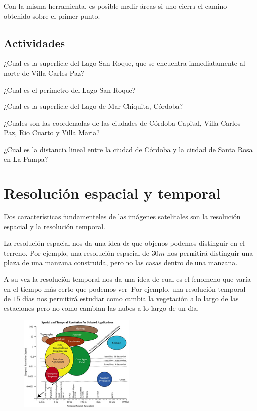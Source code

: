 \documentclass[a4paper,12pt]{book}
\begin{document}
Con la misma herramienta, es posible medir áreas si uno cierra el camino obtenido sobre el primer punto.

\section{Actividades}

\begin{que}
    ¿Cual es la superficie del Lago San Roque, que se encuentra inmediatamente al norte de Villa Carlos Paz?
\end{que}
\begin{que}
    ¿Cual es el perimetro del Lago San Roque?
\end{que}
\begin{que}
    ¿Cual es la superficie del Lago de Mar Chiquita, Córdoba?
\end{que}

\begin{que}
    ¿Cuales son las coordenadas de las ciudades de Córdoba Capital, Villa Carlos Paz, Rio Cuarto y Villa Maria?
\end{que}

\begin{que}
    ¿Cual es la distancia lineal entre la ciudad de Córdoba y la ciudad de Santa Rosa en La Pampa?
\end{que}

\chapter{Resolución espacial y temporal}
Dos características fundamenteles de las imágenes satelitales son la resolución espacial y la resolución temporal.

La resolución espacial nos da una idea de que objenos podemos distinguir en el terreno. Por ejemplo, una resolución espacial de $30m$ nos permitirá distinguir una plaza de una manzana construida, pero no las casas dentro de una manzana.

A su vez la resolución temporal nos da una idea de cual es el fenomeno que varía en el tiempo más corto que podemos ver. Por ejemplo, una resolución temporal de $15$ días nos permitirá estudiar como cambia la vegetación a lo largo de las estaciones pero no como cambian las nubes a lo largo de un día.


\begin{figure}[h!]
    \centering
    \includegraphics[width=0.5\textwidth]{fig:evst.jpg}
    \caption{}
    \label{fig:evst}
\end{figure}
\end{document}

